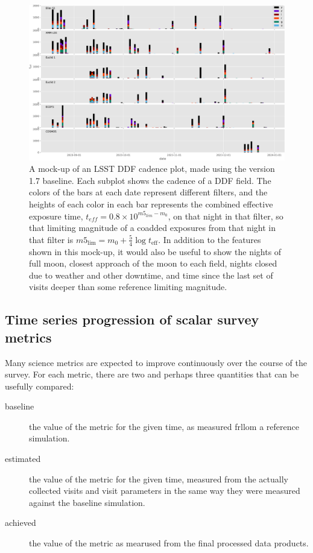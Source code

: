 \begin{figure}[htbp]
\centering
\includegraphics[height=0.4\textheight]{./figures/snhistory.pdf}
\caption{\label{fig:orgf3221e7}A mock-up of an LSST DDF cadence plot, made using the version 1.7 baseline. Each subplot shows the cadence of a DDF field. The colors of the bars at each date represent different filters, and the heights of each color in each bar represents the combined effective exposure time, \(t_{eff} = 0.8 \times 10^{m5_{lim}-m_{0}}\), on that night in that filter, so that limiting magnitude of a coadded exposures from that night in that filter is \(m5_{\mbox{lim}} = m_{0} + \frac{5}{4} \log t_{\mbox{eff}}\).  In addition to the features shown in this mock-up, it would also be useful to show the nights of full moon, closest approach of the moon to each field, nights closed due to weather and other downtime, and time since the last set of visits deeper than some reference limiting magnitude.}
\end{figure}

\subsection{Time series progression of scalar survey metrics}
\label{sec:org4d7a12f}
Many science metrics are expected to improve continuously over the course of the survey.
For each metric, there are two and perhaps three quantities that can be usefully compared:
\begin{description}
\item[{baseline}] the value of the metric for the given time, as measured frllom a reference simulation.
\item[{estimated}] the value of the metric for the given time, measured from the actually collected visits and visit parameters in the same way they were measured against the baseline simulation.
\item[{achieved}] the value of the metric as mearused from the final processed data products.
\end{description}

